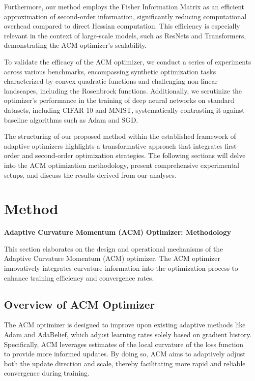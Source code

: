 \documentclass{article} %
\begin{document}
Furthermore, our method employs the Fisher Information Matrix \cite{amari1998natural} as an efficient approximation of second-order information, significantly reducing computational overhead compared to direct Hessian computation. This efficiency is especially relevant in the context of large-scale models, such as ResNets and Transformers, demonstrating the ACM optimizer's scalability.

To validate the efficacy of the ACM optimizer, we conduct a series of experiments across various benchmarks, encompassing synthetic optimization tasks characterized by convex quadratic functions and challenging non-linear landscapes, including the Rosenbrock functions. Additionally, we scrutinize the optimizer’s performance in the training of deep neural networks on standard datasets, including CIFAR-10 and MNIST, systematically contrasting it against baseline algorithms such as Adam and SGD.

The structuring of our proposed method within the established framework of adaptive optimizers highlights a transformative approach that integrates first-order and second-order optimization strategies. The following sections will delve into the ACM optimization methodology, present comprehensive experimental setups, and discuss the results derived from our analyses.

\section{Method}
\label{sec:method}
\textbf{Adaptive Curvature Momentum (ACM) Optimizer: Methodology}

This section elaborates on the design and operational mechanisms of the Adaptive Curvature Momentum (ACM) optimizer. The ACM optimizer innovatively integrates curvature information into the optimization process to enhance training efficiency and convergence rates.

\subsection{Overview of ACM Optimizer}
The ACM optimizer is designed to improve upon existing adaptive methods like Adam and AdaBelief, which adjust learning rates solely based on gradient history. Specifically, ACM leverages estimates of the local curvature of the loss function to provide more informed updates. By doing so, ACM aims to adaptively adjust both the update direction and scale, thereby facilitating more rapid and reliable convergence during training.
\end{document}
